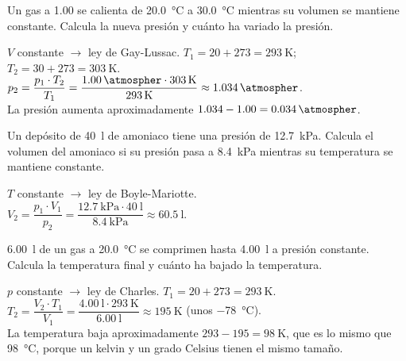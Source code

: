 \begin{exercise}
    Un gas a \qty{1.00}{\atmospher} se calienta de \qty{20.0}{\celsius} a \qty{30.0}{\celsius} mientras su volumen se mantiene constante. Calcula la nueva presión y cuánto ha variado la presión.
    \begin{solu}
        \(V\) constante \(\to\) ley de Gay-Lussac. \(T_1 = 20 + 273 = \qty{293}{\kelvin}\); \(T_2 = 30 + 273 = \qty{303}{\kelvin}\). \\
        \(p_2 = \dfrac{p_1 \cdot T_2}{T_1} = \dfrac{\qty{1.00}{\atmospher} \cdot \qty{303}{\kelvin}}{\qty{293}{\kelvin}} \approx \qty{1.034}{\atmospher}\). \\
        La presión aumenta aproximadamente \(\num{1.034} - \num{1.00} = \qty{0.034}{\atmospher}\).
    \end{solu}
\end{exercise}

\begin{exercise}
    Un depósito de \qty{40}{\litre} de amoniaco tiene una presión de \qty{12.7}{\kilo\pascal}. Calcula el volumen del amoniaco si su presión pasa a \qty{8.4}{\kilo\pascal} mientras su temperatura se mantiene constante.
    \begin{solu}
        \(T\) constante \(\to\) ley de Boyle-Mariotte. \\
        \(V_2 = \dfrac{p_1 \cdot V_1}{p_2} = \dfrac{\qty{12.7}{\kilo\pascal} \cdot \qty{40}{\litre}}{\qty{8.4}{\kilo\pascal}} \approx \qty{60.5}{\litre}\).
    \end{solu}
\end{exercise}

\begin{exercise}
    \qty{6.00}{\litre} de un gas a \qty{20.0}{\celsius} se comprimen hasta \qty{4.00}{\litre} a presión constante. Calcula la temperatura final y cuánto ha bajado la temperatura.
    \begin{solu}
        \(p\) constante \(\to\) ley de Charles. \(T_1 = 20 + 273 = \qty{293}{\kelvin}\). \\
        \(T_2 = \dfrac{V_2 \cdot T_1}{V_1} = \dfrac{\qty{4.00}{\litre} \cdot \qty{293}{\kelvin}}{\qty{6.00}{\litre}} \approx \qty{195}{\kelvin}\) (unos \qty{-78}{\celsius}). \\
        La temperatura baja aproximadamente \(293 - 195 = \qty{98}{\kelvin}\), que es lo mismo que \qty{98}{\celsius}, porque un kelvin y un grado Celsius tienen el mismo tamaño.
    \end{solu}
\end{exercise}


